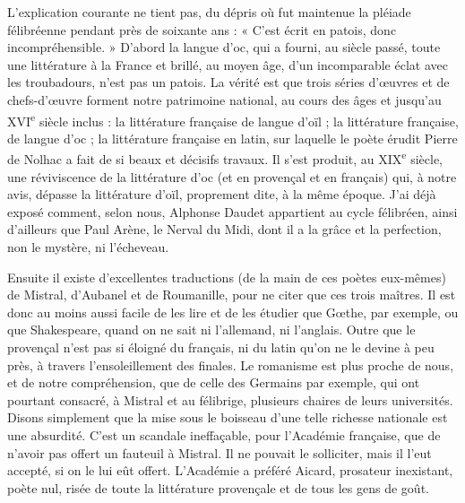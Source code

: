 \documentclass[french,twoside]{book} %
\begin{document}
L’explication courante ne tient pas, du dépris où fut maintenue la pléiade félibréenne pendant près de soixante ans : « C’est écrit en patois, donc incompréhensible. » D’abord la langue d’oc, qui a fourni, au siècle passé, toute une littérature à la France et brillé, au moyen âge, d’un incomparable éclat avec les troubadours, n’est pas un patois. La vérité est que trois séries d’œuvres et de chefs-d’œuvre forment notre patrimoine national, au cours des âges et jusqu’au XVI\textsuperscript{e} siècle inclus : la littérature française de langue d’oïl ; la littérature française, de langue d’oc ; la littérature française en latin, sur laquelle le poète érudit Pierre de Nolhac a fait de si beaux et décisifs travaux. Il s’est produit, au XIX\textsuperscript{e} siècle, une réviviscence de la littérature d’oc (et en provençal et en français) qui, à notre avis, dépasse la littérature d’oïl, proprement dite, à la même époque. J’ai déjà exposé comment, selon nous, Alphonse Daudet appartient au cycle félibréen, ainsi d’ailleurs que Paul Arène, le Nerval du Midi, dont il a la grâce et la perfection, non le mystère, ni l’écheveau.\par
Ensuite il existe d’excellentes traductions (de la main de ces poètes eux-mêmes) de Mistral, d’Aubanel et de Roumanille, pour ne citer que ces trois maîtres. Il est donc au moins aussi facile de les lire et de les étudier que Gœthe, par exemple, ou que Shakespeare, quand on ne sait ni l’allemand, ni l’anglais. Outre que le provençal n’est pas si éloigné du français, ni du latin qu’on ne le devine à peu près, à travers l’ensoleillement des finales. Le romanisme est plus proche de nous, et de notre compréhension, que de celle des Germains par exemple, qui ont pourtant consacré, à Mistral et au félibrige, plusieurs chaires de leurs universités. Disons simplement que la mise sous le boisseau d’une telle richesse nationale est une absurdité. C’est un scandale ineffaçable, pour l’Académie française, que de n’avoir pas offert un fauteuil à Mistral. Il ne pouvait le solliciter, mais il l’eut accepté, si on le lui eût offert. L’Académie a préféré Aicard, prosateur inexistant, poète nul, risée de toute la littérature provençale et de tous les gens de goût.\par
\end{document}
